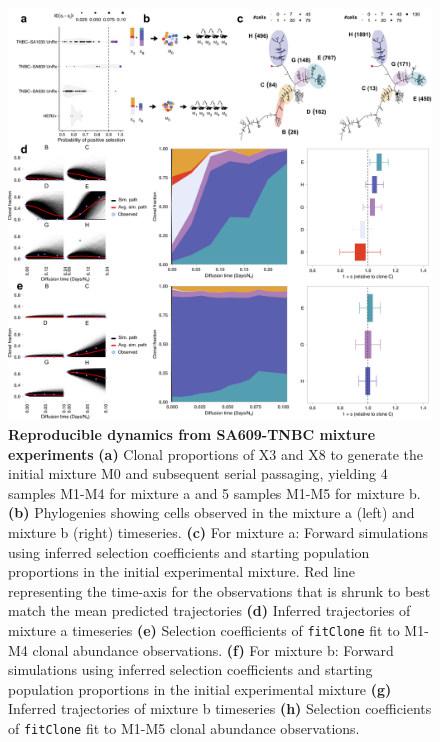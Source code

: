 \begin{figure}
\centering
\includegraphics[width=\textwidth]{Figures/Mixturenew.png}
	
\caption[Reproducible dynamics from SA609-TNBC mixture experiments]
	{\small
	\textbf{Reproducible dynamics from SA609-TNBC mixture experiments}
	    \textbf{(a)} Clonal proportions of X3 and X8 to generate the initial mixture M0 and subsequent serial passaging, yielding 4 samples M1-M4 for mixture a and 5 samples
M1-M5 for mixture b.
	    \textbf{(b)} Phylogenies showing cells observed in the mixture a (left) and mixture b (right) timeseries.
	     \textbf{(c)} For mixture a: Forward simulations using inferred selection coefficients and starting population proportions in the initial experimental mixture. Red line representing the time-axis for the observations that is shrunk to best match the mean predicted trajectories
	     \textbf{(d)} Inferred trajectories of mixture a timeseries \textbf{(e)} Selection coefficients of \texttt{fitClone} fit to M1-M4 clonal abundance observations.
 \textbf{(f)} For mixture b: Forward simulations using inferred selection coefficients and starting population proportions in the initial experimental mixture
  \textbf{(g)} Inferred trajectories of mixture b timeseries
	  \textbf{(h)} Selection coefficients of \texttt{fitClone} fit to
M1-M5 clonal abundance observations.    
}
	\label{fig:Mixturenew}
\end{figure}


